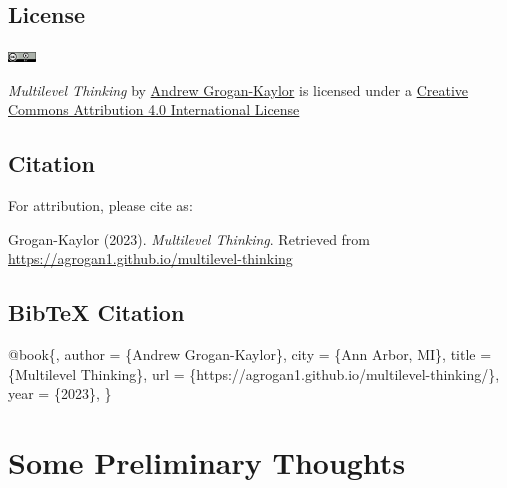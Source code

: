 \documentclass[
  letterpaper,
  DIV=11,
  numbers=noendperiod]{scrreprt}
\newenvironment{Shaded}{\begin{snugshade}}{\end{snugshade}}
\newcommand{\NormalTok}[1]{\textcolor[rgb]{0.00,0.23,0.31}{#1}}
\begin{document}
\section*{License}\label{license}


\includegraphics[width=0.29in,height=\textheight]{88x31.png}

\emph{Multilevel Thinking} by \href{https://agrogan1.github.io/}{Andrew
Grogan-Kaylor} is licensed under a
\href{http://creativecommons.org/licenses/by/4.0/}{Creative Commons
Attribution 4.0 International License}

\section*{Citation}\label{citation}


For attribution, please cite as:

Grogan-Kaylor (2023). \emph{Multilevel Thinking}. Retrieved from
\url{https://agrogan1.github.io/multilevel-thinking}

\section*{BibTeX Citation}\label{bibtex-citation}


\begin{Shaded}
\begin{Highlighting}[]
\NormalTok{@book\{,}
\NormalTok{   author = \{Andrew Grogan{-}Kaylor\},}
\NormalTok{   city = \{Ann Arbor, MI\},}
\NormalTok{   title = \{Multilevel Thinking\},}
\NormalTok{   url = \{https://agrogan1.github.io/multilevel{-}thinking/\},}
\NormalTok{   year = \{2023\},}
\NormalTok{\}}
\end{Highlighting}
\end{Shaded}


\chapter*{Some Preliminary Thoughts}\label{some-preliminary-thoughts}
\end{document}
